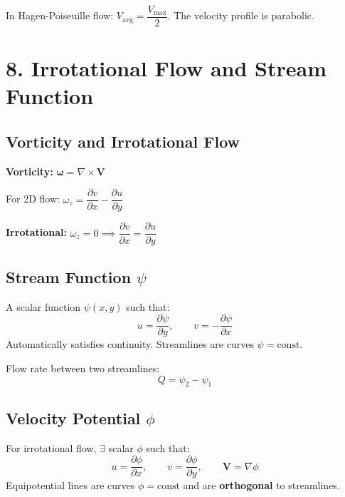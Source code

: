 \documentclass[12pt]{article}
\begin{document}
\begin{keybox}
In Hagen-Poiseuille flow: $V_{\text{avg}} = \dfrac{V_{\max}}{2}$. The velocity profile is parabolic.
\end{keybox}

\section{8. Irrotational Flow and Stream Function}

\subsection{Vorticity and Irrotational Flow}

\begin{formulabox}
\textbf{Vorticity:} $\boldsymbol{\omega} = \nabla \times \mathbf{V}$

For 2D flow: $\omega_z = \dfrac{\partial v}{\partial x} - \dfrac{\partial u}{\partial y}$

\textbf{Irrotational:} $\omega_z = 0 \implies \dfrac{\partial v}{\partial x} = \dfrac{\partial u}{\partial y}$
\end{formulabox}

\subsection{Stream Function $\psi$}

\begin{defbox}
A scalar function $\psi(x,y)$ such that:
\[
  u = \frac{\partial \psi}{\partial y}, \qquad v = -\frac{\partial \psi}{\partial x}
\]
Automatically satisfies continuity. Streamlines are curves $\psi = \text{const}$.
\end{defbox}

\begin{formulabox}
Flow rate between two streamlines:
\[
  Q = \psi_2 - \psi_1
\]
\end{formulabox}

\subsection{Velocity Potential $\phi$}

\begin{defbox}
For irrotational flow, $\exists$ scalar $\phi$ such that:
\[
  u = \frac{\partial \phi}{\partial x}, \qquad v = \frac{\partial \phi}{\partial y}, \qquad \mathbf{V} = \nabla\phi
\]
Equipotential lines are curves $\phi = \text{const}$ and are \textbf{orthogonal} to streamlines.
\end{defbox}
\end{document}
